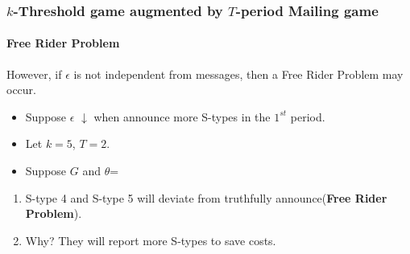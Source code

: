 \documentclass[9pt]{beamer}
\begin{document}
\begin{frame}
   \frametitle{$k$-Threshold game augmented by $T$-period Mailing game}
\framesubtitle{Free Rider Problem}

\alert{However}, if $\epsilon$ is \alert{not independent from messages}, then a \alert{Free Rider Problem} may occur.
\begin{itemize}
\item Suppose $\epsilon$ \alert{$\downarrow$} when announce \alert{more} S-types in the \alert{$1^{st}$} period.
\item Let $k=5$, $T=2$.
\item Suppose $G$ and $\theta$=
\begin{center}
\end{center}



\end{itemize}

\begin{enumerate}
\item S-type 4 and S-type 5 will deviate from truthfully announce(\textbf{Free Rider Problem}). 
\item Why? They will report more S-types to save costs.
\end{enumerate}


\end{frame}
\end{document}
